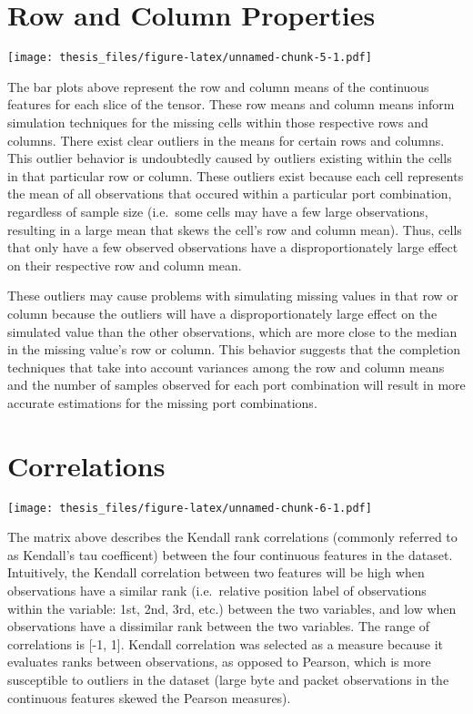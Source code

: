\documentclass[12pt,twoside]{dukestatscithesis}
\theoremstyle{definition}
\theoremstyle{definition}
\theoremstyle{definition}
\theoremstyle{remark}
\begin{document}
\section{Row and Column Properties}\label{row-and-column-properties}

\texttt{[image: thesis\_files/figure-latex/unnamed-chunk-5-1.pdf]}

The bar plots above represent the row and column means of the continuous
features for each slice of the tensor. These row means and column means
inform simulation techniques for the missing cells within those
respective rows and columns. There exist clear outliers in the means for
certain rows and columns. This outlier behavior is undoubtedly caused by
outliers existing within the cells in that particular row or column.
These outliers exist because each cell represents the mean of all
observations that occured within a particular port combination,
regardless of sample size (i.e.~some cells may have a few large
observations, resulting in a large mean that skews the cell's row and
column mean). Thus, cells that only have a few observed observations
have a disproportionately large effect on their respective row and
column mean.

These outliers may cause problems with simulating missing values in that
row or column because the outliers will have a disproportionately large
effect on the simulated value than the other observations, which are
more close to the median in the missing value's row or column. This
behavior suggests that the completion techniques that take into account
variances among the row and column means and the number of samples
observed for each port combination will result in more accurate
estimations for the missing port combinations.

\section{Correlations}\label{correlations}

\texttt{[image: thesis\_files/figure-latex/unnamed-chunk-6-1.pdf]}

The matrix above describes the Kendall rank correlations (commonly
referred to as Kendall's tau coefficent) between the four continuous
features in the dataset. Intuitively, the Kendall correlation between
two features will be high when observations have a similar rank
(i.e.~relative position label of observations within the variable: 1st,
2nd, 3rd, etc.) between the two variables, and low when observations
have a dissimilar rank between the two variables. The range of
correlations is {[}-1, 1{]}. Kendall correlation was selected as a
measure because it evaluates ranks between observations, as opposed to
Pearson, which is more susceptible to outliers in the dataset (large
byte and packet observations in the continuous features skewed the
Pearson measures).
\end{document}
